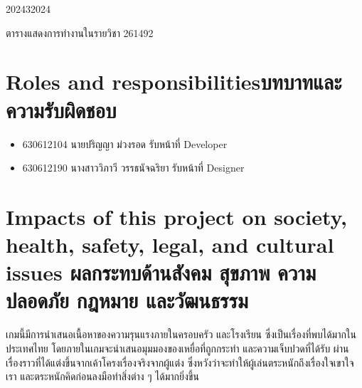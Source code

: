 \begin{plan}{1}{2024}{3}{2024}
    \caption[ตารางการทำงานรายวิชา 261492]{ตารางแสดงการทำงานในรายวิชา 261492}
\end{plan}

\newpage
\section{\ifenglish Roles and responsibilities\else บทบาทและความรับผิดชอบ\fi}
\begin{itemize}
    \item[] 630612104 นายปริญญา ม่วงรอด รับหน้าที่ Developer
    \item[] 630612190 นางสาววิภาวี วรรธนัจฉริยา รับหน้าที่ Designer
\end{itemize}

\section{\ifenglish%
      Impacts of this project on society, health, safety, legal, and cultural issues
  \else%
      ผลกระทบด้านสังคม สุขภาพ ความปลอดภัย กฎหมาย และวัฒนธรรม
  \fi}

เกมนี้มีการนำเสนอเนื้อหาของความรุนแรงภายในครอบครัว และโรงเรียน ซึ่งเป็นเรื่องที่พบได้มากในประเทศไทย 
โดยภายในเกมจะนำเสนอมุมมองของเหยื่อที่ถูกกระทำ และความเจ็บปวดที่ได้รับ ผ่านเรื่องราวที่ได้แต่งขึ้นจากเค้าโครงเรื่องจริงจากผู้แต่ง
ซึ่งหวังว่าจะทำให้ผู้เล่นตระหนักถึงเรื่องใจเขาใจเรา และตระหนักคิดก่อนลงมือทำสิ่งต่าง ๆ ได้มากยิ่งขึ้น

